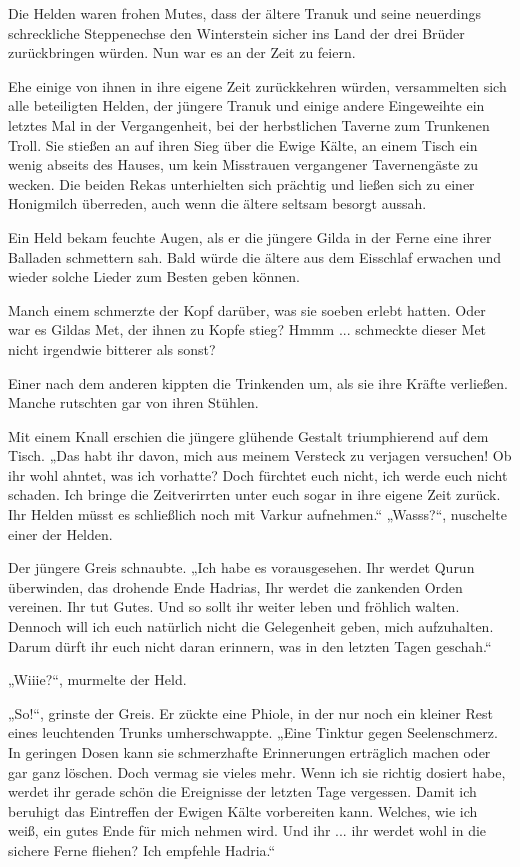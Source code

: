 Die Helden waren frohen Mutes, dass der ältere Tranuk und seine neuerdings schreckliche Steppenechse den Winterstein sicher ins Land der drei Brüder zurückbringen würden. Nun war es an der Zeit zu feiern.

Ehe einige von ihnen in ihre eigene Zeit zurückkehren würden, versammelten sich alle beteiligten Helden, der jüngere Tranuk und einige andere Eingeweihte ein letztes Mal in der Vergangenheit, bei der herbstlichen Taverne zum Trunkenen Troll. Sie stießen an auf ihren Sieg über die Ewige Kälte, an einem Tisch ein wenig abseits des Hauses, um kein Misstrauen vergangener Tavernengäste zu wecken. Die beiden Rekas unterhielten sich prächtig und ließen sich zu einer Honigmilch überreden, auch wenn die ältere seltsam besorgt aussah. 

Ein Held bekam feuchte Augen, als er die jüngere Gilda in der Ferne eine ihrer Balladen schmettern sah. Bald würde die ältere aus dem Eisschlaf erwachen und wieder solche Lieder zum Besten geben können. 

Manch einem schmerzte der Kopf darüber, was sie soeben erlebt hatten. Oder war es Gildas Met, der ihnen zu Kopfe stieg? Hmmm ... schmeckte dieser Met nicht irgendwie bitterer als sonst?

Einer nach dem anderen kippten die Trinkenden um, als sie ihre Kräfte verließen. Manche rutschten gar von ihren Stühlen. 

Mit einem Knall erschien die jüngere glühende Gestalt triumphierend auf dem Tisch. „Das habt ihr davon, mich aus meinem Versteck zu verjagen versuchen! Ob ihr wohl ahntet, was ich vorhatte? Doch fürchtet euch nicht, ich werde euch nicht schaden. Ich bringe die Zeitverirrten unter euch sogar in ihre eigene Zeit zurück. Ihr Helden müsst es schließlich noch mit Varkur aufnehmen.“ „Wasss?“, nuschelte einer der Helden. 

Der jüngere Greis schnaubte. „Ich habe es vorausgesehen. Ihr werdet Qurun überwinden, das drohende Ende Hadrias, Ihr werdet die zankenden Orden vereinen. Ihr tut Gutes. Und so sollt ihr weiter leben und fröhlich walten. Dennoch will ich euch natürlich nicht die Gelegenheit geben, mich aufzuhalten. Darum dürft ihr euch nicht daran erinnern, was in den letzten Tagen geschah.“ 

„Wiiie?“, murmelte der Held.

„So!“, grinste der Greis. Er zückte eine Phiole, in der nur noch ein kleiner Rest eines leuchtenden Trunks umherschwappte. „Eine Tinktur gegen Seelenschmerz. In geringen Dosen kann sie schmerzhafte Erinnerungen erträglich machen oder gar ganz löschen. Doch vermag sie vieles mehr. Wenn ich sie richtig dosiert habe, werdet ihr gerade schön die Ereignisse der letzten Tage vergessen. Damit ich beruhigt das Eintreffen der Ewigen Kälte vorbereiten kann. Welches, wie ich weiß, ein gutes Ende für mich nehmen wird. Und ihr ... ihr werdet wohl in die sichere Ferne fliehen? Ich empfehle Hadria.“


